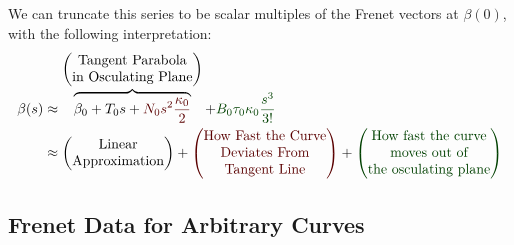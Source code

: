 \M
We can truncate this series to be scalar multiples of the Frenet vectors
at $\beta(0)$, with the following interpretation:
\begin{equation}
  \begin{split}
  \beta(s)&\approx
  \overbrace{\beta_{0} +T_{0} s
+{\color{DarkRed}N_{0}s^{2}\frac{\kappa_{0}}{2}}}^{\begin{pmatrix}\mbox{Tangent Parabola}\\
\mbox{in Osculating Plane}
\end{pmatrix}}
+{\color{DarkGreen}B_{0}\tau_{0}\kappa_{0}\frac{s^{3}}{3!}}\\
&\approx\begin{pmatrix}
  \mbox{Linear}\\
  \mbox{Approximation}
\end{pmatrix}
+{\color{DarkRed}\begin{pmatrix}
    \mbox{How Fast the Curve}\\
    \mbox{Deviates From}\\
    \mbox{Tangent Line}
\end{pmatrix}}
+{\color{DarkGreen}\begin{pmatrix}\mbox{How fast the curve}\\
  \mbox{moves out of}\\
  \mbox{the osculating plane}
\end{pmatrix}}
  \end{split}
\end{equation}

\subsection{Frenet Data for Arbitrary Curves}

